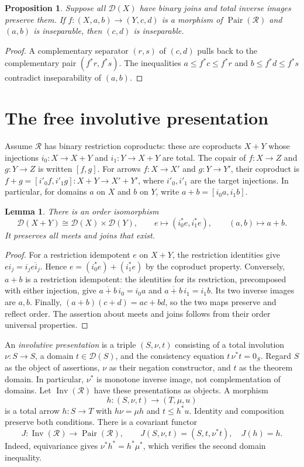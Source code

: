 \documentclass[11pt]{article}
\newtheorem{proposition}[theorem]{Proposition}
\newtheorem{lemma}[theorem]{Lemma}
\newcommand{\R}{\mathscr R}
\newcommand{\D}{\mathscr D}
\newcommand{\Pair}{\operatorname{Pair}}
\newcommand{\Inv}{\operatorname{Inv}}
\begin{document}
\begin{proposition}\label{prop:transport}
Suppose all $\D(X)$ have binary joins and total inverse images preserve
them. If $f:(X,a,b)\to(Y,c,d)$ is a morphism of $\Pair(\R)$ and
$(a,b)$ is inseparable, then $(c,d)$ is inseparable.
\end{proposition}
\begin{proof}
A complementary separator $(r,s)$ of $(c,d)$ pulls back to the
complementary pair $(f^*r,f^*s)$. The inequalities
$a\le f^*c\le f^*r$ and $b\le f^*d\le f^*s$ contradict
inseparability of $(a,b)$.
\end{proof}

\section{The free involutive presentation}

Assume $\R$ has binary restriction coproducts: these are coproducts
$X+Y$ whose injections $i_0:X\to X+Y$ and $i_1:Y\to X+Y$ are
total. The copair of $f:X\to Z$ and $g:Y\to Z$ is written $[f,g]$.
For arrows $f:X\to X'$ and $g:Y\to Y'$, their coproduct is
$f+g=[i'_0f,i'_1g]:X+Y\to X'+Y'$, where $i'_0,i'_1$
are the target injections. In particular, for domains $a$ on $X$
and $b$ on $Y$, write $a+b=[i_0a,i_1b]$.

\begin{lemma}\label{lem:decompose}
There is an order isomorphism
\[
 \D(X+Y)\cong\D(X)\times\D(Y),\qquad
 e\longmapsto(i_0^*e,i_1^*e),\qquad (a,b)\longmapsto a+b.
\]
It preserves all meets and joins that exist.
\end{lemma}
\begin{proof}
For a restriction idempotent $e$ on $X+Y$, the restriction identities
give $ei_j=i_j\overline{ei_j}$. Hence
$e=(i_0^*e)+(i_1^*e)$ by the coproduct property.
Conversely, $a+b$ is a restriction idempotent: the identities for its
restriction, precomposed with either injection, give
$\overline{a+b}\,i_0=i_0a$ and
$\overline{a+b}\,i_1=i_1b$. Its two inverse images are $a,b$.
Finally, $(a+b)(c+d)=ac+bd$, so the two maps preserve and reflect
order. The assertion about meets and joins follows from their order
universal properties.
\end{proof}

An \emph{involutive presentation} is a triple $(S,\nu,t)$ consisting
of a total involution $\nu:S\to S$, a domain $t\in\D(S)$, and
the consistency equation $t\,\nu^*t=0_S$.
Regard $S$ as the object of assertions, $\nu$ as their negation
constructor, and $t$ as the theorem domain. In particular, $\nu^*$ is monotone
inverse image, not complementation of domains.
Let $\Inv(\R)$ have these presentations as objects. A morphism
\[
 h:(S,\nu,t)\longrightarrow(T,\mu,u)
\]
is a total arrow $h:S\to T$ with $h\nu=\mu h$ and $t\le h^*u$.
Identity and composition preserve both conditions.
There is a covariant functor
\[
 J:\Inv(\R)\longrightarrow\Pair(\R),\qquad
 J(S,\nu,t)=(S,t,\nu^*t),\quad J(h)=h.
\]
Indeed, equivariance gives $\nu^*h^*=h^*\mu^*$, which verifies
the second domain inequality.
\end{document}
